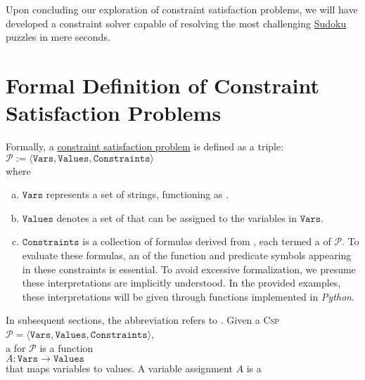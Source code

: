 Upon concluding our exploration of constraint satisfaction problems, we will have developed a constraint solver capable of resolving the most challenging \href{https://en.wikipedia.org/wiki/Sudoku}{Sudoku} puzzles in mere seconds.

\section[Formal Definition of \textsc{Csp}s]{Formal Definition of Constraint Satisfaction Problems}
Formally, a 
\href{https://en.wikipedia.org/wiki/Constraint_satisfaction_problem}{constraint satisfaction problem} is defined as a triple:
\\[0.2cm]
\hspace*{1.3cm}
$\mathcal{P} := \langle \texttt{Vars}, \texttt{Values}, \texttt{Constraints} \rangle$
\\[0.2cm]
where 
\begin{enumerate}[(a)]
\item $\texttt{Vars}$ represents a set of strings, functioning as .
\item $\texttt{Values}$ denotes a set of  that can be assigned to the variables in $\texttt{Vars}$.
\item $\texttt{Constraints}$ is a collection of formulas derived from , each termed a
       of $\mathcal{P}$. To evaluate these formulas, an  of the function and
      predicate symbols appearing in these constraints is essential. To avoid excessive formalization, we presume
      these interpretations are implicitly understood. In the provided examples, these interpretations will
      be given through functions implemented in \textsl{Python}. 
\end{enumerate}
In subsequent sections, the abbreviation  refers to .
Given a \textsc{Csp}
\\[0.2cm]
\hspace*{1.3cm}
 $\mathcal{P} = \langle \texttt{Vars}, \texttt{Values}, \texttt{Constraints} \rangle$, 
\\[0.2cm]
a  for $\mathcal{P}$ is a function 
\\[0.2cm]
\hspace*{1.3cm}
$A: \texttt{Vars} \rightarrow \texttt{Values}$
\\[0.2cm]
that maps variables to values. A variable assignment $A$ is a  
